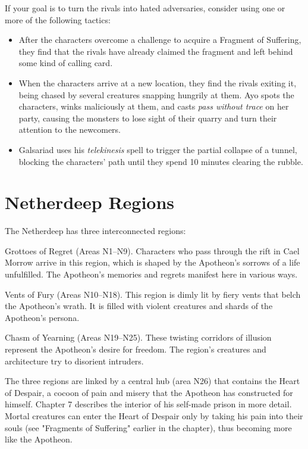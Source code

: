 \documentclass[10pt,a4paper,twoside,bg=print,twocolumn,openany,nodeprecatedcode]{dndbook}
\begin{document}
If your goal is to turn the rivals into hated adversaries, consider using one or more of the following tactics:


\begin{itemize}
\item After the characters overcome a challenge to acquire a Fragment of Suffering, they find that the rivals have already claimed the fragment and left behind some kind of calling card.
\item When the characters arrive at a new location, they find the rivals exiting it, being chased by several creatures snapping hungrily at them. Ayo spots the characters, winks maliciously at them, and casts \textit{pass without trace} on her party, causing the monsters to lose sight of their quarry and turn their attention to the newcomers.
\item Galsariad uses his \textit{telekinesis} spell to trigger the partial collapse of a tunnel, blocking the characters' path until they spend 10 minutes clearing the rubble.
\end{itemize}

\section{Netherdeep Regions}
The Netherdeep has three interconnected regions:

Grottoes of Regret (Areas N1–N9). Characters who pass through the rift in Cael Morrow arrive in this region, which is shaped by the Apotheon's sorrows of a life unfulfilled. The Apotheon's memories and regrets manifest here in various ways.

Vents of Fury (Areas N10–N18). This region is dimly lit by fiery vents that belch the Apotheon's wrath. It is filled with violent creatures and shards of the Apotheon's persona.

Chasm of Yearning (Areas N19–N25). These twisting corridors of illusion represent the Apotheon's desire for freedom. The region's creatures and architecture try to disorient intruders.

The three regions are linked by a central hub (area N26) that contains the Heart of Despair, a cocoon of pain and misery that the Apotheon has constructed for himself. Chapter 7 describes the interior of his self-made prison in more detail. Mortal creatures can enter the Heart of Despair only by taking his pain into their souls (see "Fragments of Suffering" earlier in the chapter), thus becoming more like the Apotheon.
\end{document}
